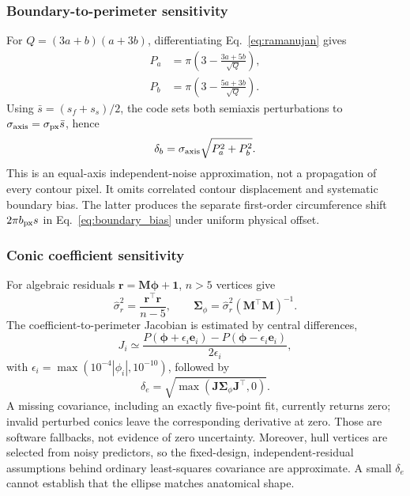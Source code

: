 \subsubsection{Boundary-to-perimeter sensitivity}
For $Q=(3a+b)(a+3b)$, differentiating Eq.~\eqref{eq:ramanujan} gives
\begin{align}
P_a&=\pi\left(3-\frac{3a+5b}{\sqrt Q}\right),\label{eq:ramanujan_partial_a}\\
P_b&=\pi\left(3-\frac{5a+3b}{\sqrt Q}\right).\label{eq:ramanujan_partial_b}
\end{align}
Using $\bar s=(s_f+s_s)/2$, the code sets both semiaxis perturbations to $\sigma_{\rm axis}=\sigma_{\rm px}\bar s$, hence
\begin{equation}
\delta_b=\sigma_{\rm axis}\sqrt{P_a^2+P_b^2}.
\end{equation}
This is an equal-axis independent-noise approximation, not a propagation of every contour pixel. It omits correlated contour displacement and systematic boundary bias. The latter produces the separate first-order circumference shift $2\pi b_{\rm px}s$ in Eq.~\eqref{eq:boundary_bias} under uniform physical offset.

\subsubsection{Conic coefficient sensitivity}
For algebraic residuals $\mathbf r=\mathbf M\boldsymbol\phi+\mathbf1$, $n>5$ vertices give
\begin{equation}
\hat\sigma_r^2=\frac{\mathbf r^\top\mathbf r}{n-5},\qquad
\mathbf\Sigma_\phi=\hat\sigma_r^2(\mathbf M^\top\mathbf M)^{-1}.
\end{equation}
The coefficient-to-perimeter Jacobian is estimated by central differences,
\begin{equation}
J_i\simeq\frac{P(\boldsymbol\phi+\epsilon_i\mathbf e_i)-P(\boldsymbol\phi-\epsilon_i\mathbf e_i)}{2\epsilon_i},
\end{equation}
with $\epsilon_i=\max(10^{-4}|\phi_i|,10^{-10})$, followed by
\begin{equation}
\delta_e=\sqrt{\max(\mathbf J\mathbf\Sigma_\phi\mathbf J^\top,0)}.
\end{equation}
A missing covariance, including an exactly five-point fit, currently returns zero; invalid perturbed conics leave the corresponding derivative at zero. Those are software fallbacks, not evidence of zero uncertainty. Moreover, hull vertices are selected from noisy predictors, so the fixed-design, independent-residual assumptions behind ordinary least-squares covariance are approximate. A small $\delta_e$ cannot establish that the ellipse matches anatomical shape.


